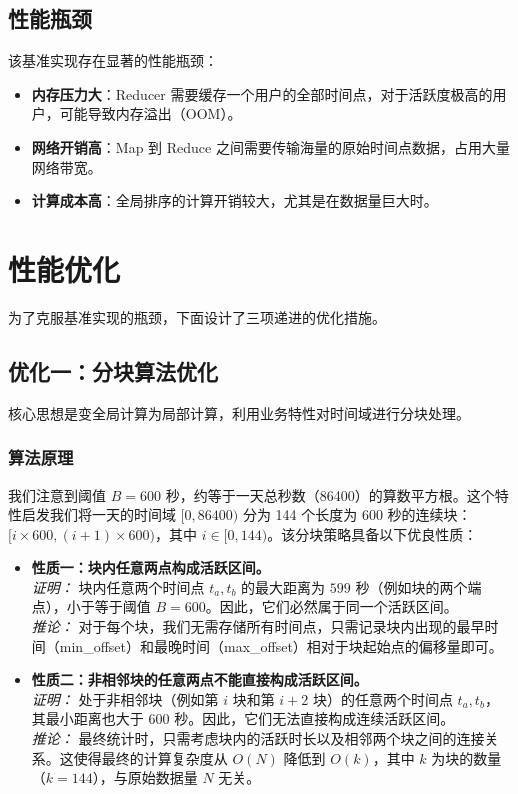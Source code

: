 \documentclass[UTF8]{ctexart}
\begin{document}
\subsection{性能瓶颈}
该基准实现存在显著的性能瓶颈：
\begin{itemize}
    \item \textbf{内存压力大}：Reducer 需要缓存一个用户的全部时间点，对于活跃度极高的用户，可能导致内存溢出（OOM）。
    \item \textbf{网络开销高}：Map 到 Reduce 之间需要传输海量的原始时间点数据，占用大量网络带宽。
    \item \textbf{计算成本高}：全局排序的计算开销较大，尤其是在数据量巨大时。
\end{itemize}

\section{性能优化}
为了克服基准实现的瓶颈，下面设计了三项递进的优化措施。

\subsection{优化一：分块算法优化}
核心思想是变全局计算为局部计算，利用业务特性对时间域进行分块处理。

\subsubsection{算法原理}
我们注意到阈值 $B=600$ 秒，约等于一天总秒数（86400）的算数平方根。这个特性启发我们将一天的时间域 $[0, 86400)$ 分为 144 个长度为 600 秒的连续块：$[i \times 600, (i+1) \times 600)$，其中 $i \in [0, 144)$。该分块策略具备以下优良性质：

\begin{itemize}
    \item \textbf{性质一：块内任意两点构成活跃区间。} \\
    \textit{证明：} 块内任意两个时间点 $t_a, t_b$ 的最大距离为 $599$ 秒（例如块的两个端点），小于等于阈值 $B=600$。因此，它们必然属于同一个活跃区间。\\
    \textit{推论：} 对于每个块，我们无需存储所有时间点，只需记录块内出现的最早时间（min\_offset）和最晚时间（max\_offset）相对于块起始点的偏移量即可。

    \item \textbf{性质二：非相邻块的任意两点不能直接构成活跃区间。} \\
    \textit{证明：} 处于非相邻块（例如第 $i$ 块和第 $i+2$ 块）的任意两个时间点 $t_a, t_b$，其最小距离也大于 $600$ 秒。因此，它们无法直接构成连续活跃区间。\\
    \textit{推论：} 最终统计时，只需考虑块内的活跃时长以及相邻两个块之间的连接关系。这使得最终的计算复杂度从 $O(N)$ 降低到 $O(k)$，其中 $k$ 为块的数量（$k=144$），与原始数据量 $N$ 无关。
\end{itemize}
\end{document}

